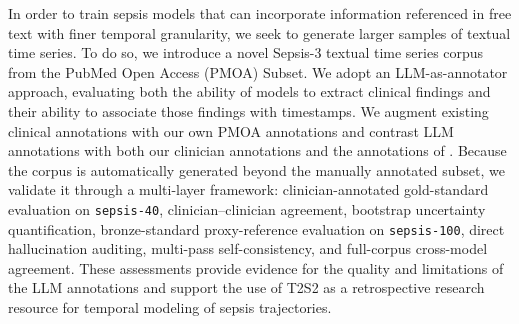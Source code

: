 \documentclass[pmlr,twocolumn,10pt]{jmlr} %
\begin{document}
In order to train sepsis models that can incorporate information referenced in free text with finer temporal granularity, we seek to generate larger samples of textual time series.
To do so, we introduce a novel Sepsis-3 textual time series corpus from the PubMed Open Access (PMOA) Subset.
We adopt an LLM-as-annotator approach, evaluating both the ability of models to extract clinical findings and their ability to associate those findings with timestamps.
We augment existing clinical annotations with our own PMOA annotations and contrast LLM annotations with both our clinician annotations and the annotations of \cite{frattallone2024using}.
Because the corpus is automatically generated beyond the manually annotated subset, we validate it through a multi-layer framework: clinician-annotated gold-standard evaluation on \texttt{sepsis-40}, clinician--clinician agreement, bootstrap uncertainty quantification, bronze-standard proxy-reference evaluation on \texttt{sepsis-100}, direct hallucination auditing, multi-pass self-consistency, and full-corpus cross-model agreement.
These assessments provide evidence for the quality and limitations of the LLM annotations and support the use of T2S2 as a retrospective research resource for temporal modeling of sepsis trajectories.
\end{document}
